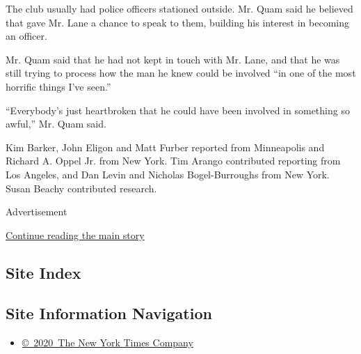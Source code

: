 The club usually had police officers stationed outside. Mr. Quam said he
believed that gave Mr. Lane a chance to speak to them, building his
interest in becoming an officer.

Mr. Quam said that he had not kept in touch with Mr. Lane, and that he
was still trying to process how the man he knew could be involved ``in
one of the most horrific things I've seen.''

``Everybody's just heartbroken that he could have been involved in
something so awful,'' Mr. Quam said.

Kim Barker, John Eligon and Matt Furber reported from Minneapolis and
Richard A. Oppel Jr. from New York. Tim Arango contributed reporting
from Los Angeles, and Dan Levin and Nicholas Bogel-Burroughs from New
York. Susan Beachy contributed research.

Advertisement

\protect\hyperlink{after-bottom}{Continue reading the main story}

\hypertarget{site-index}{%
\subsection{Site Index}\label{site-index}}

\hypertarget{site-information-navigation}{%
\subsection{Site Information
Navigation}\label{site-information-navigation}}

\begin{itemize}
\tightlist
\item
  \href{https://help.nytimes3xbfgragh.onion/hc/en-us/articles/115014792127-Copyright-notice}{©~2020~The
  New York Times Company}
\end{itemize}

